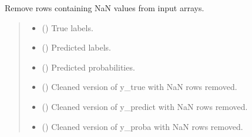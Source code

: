\documentclass[letterpaper,10pt,english]{sphinxmanual}
\begin{document}

\begin{fulllineitems}
\label{\detokenize{calzone:calzone.utils.removing_nan}}
\pysigstartsignatures
{}
\pysigstopsignatures
\sphinxAtStartPar
Remove rows containing NaN values from input arrays.
\begin{quote}\begin{description}
\begin{itemize}
\item {} 
\sphinxAtStartPar
{} () \textendash{} True labels.

\item {} 
\sphinxAtStartPar
{} () \textendash{} Predicted labels.

\item {} 
\sphinxAtStartPar
{} () \textendash{} Predicted probabilities.

\end{itemize}

\begin{itemize}
\item {} 
\sphinxAtStartPar
{} () \textendash{} Cleaned version of y\_true with NaN rows removed.

\item {} 
\sphinxAtStartPar
{} () \textendash{} Cleaned version of y\_predict with NaN rows removed.

\item {} 
\sphinxAtStartPar
{} () \textendash{} Cleaned version of y\_proba with NaN rows removed.

\end{itemize}

\end{description}\end{quote}

\end{fulllineitems}
\end{document}
